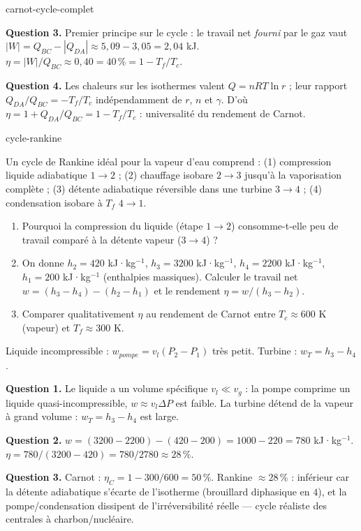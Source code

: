 \begin{exo}{carnot-cycle-complet}
\begin{solution}
\textbf{Question 3.} Premier principe sur le cycle : le travail net \emph{fourni} par le gaz vaut $|W| = Q_{BC} - |Q_{DA}| \approx 5{,}09 - 3{,}05 = 2{,}04$ kJ. $\eta = |W|/Q_{BC} \approx 0{,}40 = 40\,\% = 1 - T_f/T_c$. \checkmark

\textbf{Question 4.} Les chaleurs sur les isothermes valent $Q = nR T \ln r$ ; leur rapport $Q_{DA}/Q_{BC} = -T_f/T_c$ indépendamment de $r$, $n$ et $\gamma$. D'où $\eta = 1 + Q_{DA}/Q_{BC} = 1 - T_f/T_c$ : universalité du rendement de Carnot.
\end{solution}
\end{exo}

\begin{exo}{cycle-rankine}

Un cycle de Rankine idéal pour la vapeur d'eau comprend : (1) compression liquide adiabatique $1\to2$ ; (2) chauffage isobare $2\to3$ jusqu'à la vaporisation complète ; (3) détente adiabatique réversible dans une turbine $3\to4$ ; (4) condensation isobare à $T_f$ $4\to1$.

\begin{enumerate}
\item Pourquoi la compression du liquide (étape $1\to2$) consomme-t-elle peu de travail comparé à la détente vapeur ($3\to4$) ?
\item On donne $h_2 = 420$ kJ·kg$^{-1}$, $h_3 = 3200$ kJ·kg$^{-1}$, $h_4 = 2200$ kJ·kg$^{-1}$, $h_1 = 200$ kJ·kg$^{-1}$ (enthalpies massiques). Calculer le travail net $w = (h_3-h_4) - (h_2-h_1)$ et le rendement $\eta = w/(h_3-h_2)$.
\item Comparer qualitativement $\eta$ au rendement de Carnot entre $T_c \approx 600$ K (vapeur) et $T_f \approx 300$ K.
\end{enumerate}

\begin{indication}
Liquide incompressible : $w_{pompe} = v_l(P_2-P_1)$ très petit. Turbine : $w_T = h_3-h_4$.
\end{indication}

\begin{solution}
\textbf{Question 1.} Le liquide a un volume spécifique $v_l \ll v_g$ : la pompe comprime un liquide quasi-incompressible, $w \approx v_l\Delta P$ est faible. La turbine détend de la vapeur à grand volume : $w_T = h_3-h_4$ est large.

\textbf{Question 2.} $w = (3200-2200) - (420-200) = 1000 - 220 = 780$ kJ·kg$^{-1}$. $\eta = 780/(3200-420) = 780/2780 \approx 28\,\%$.

\textbf{Question 3.} Carnot : $\eta_C = 1 - 300/600 = 50\,\%$. Rankine $\approx 28\,\%$ : inférieur car la détente adiabatique s'écarte de l'isotherme (brouillard diphasique en $4$), et la pompe/condensation dissipent de l'irréversibilité réelle — cycle réaliste des centrales à charbon/nucléaire.
\end{solution}
\end{exo}

